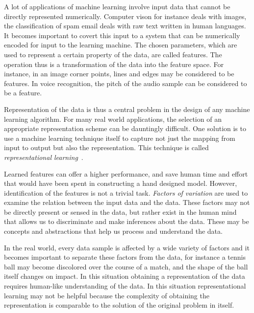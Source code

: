 A lot of applications of machine learning involve input data that cannot be directly represented numerically. Computer vison for instance deals with images, the classification of spam email deals with raw text written in human languages. It becomes important to covert this input to a system that can be numerically encoded for input to the learning machine. The chosen parameters, which are used to represent a certain property of the data, are called features. The operation thus is a transformation of the data into the feature space. For instance, in an image corner points, lines and edges may be considered to be features. In voice recognition, the pitch of the audio sample can be considered to be a feature.

Representation of the data is thus a central problem in the design of any machine learning algorithm. For many real world applications, the selection of an appropriate representation scheme can be dauntingly difficult. One solution is to use a machine learning technique itself to capture not just the mapping from input to output but also the representation. This technique is called \emph{representational learning}~\cite{bengio2013representation}.

Learned features can offer a higher performance, and save human time and effort that would have been spent in constructing a hand designed model. However, identification of the features is not a trivial task.
\emph{Factors of variation} are used to examine the relation between the input data and the data. These factors may not be directly present or sensed in the data, but rather exist in the human mind that allows us to discriminate and make inferences about the data. These may be concepts and abstractions that help us process and understand the data. 


In the real world, every data sample is affected by a wide variety of factors and it becomes important to separate these factors from the data, for instance a tennis ball may become discolored over the course of a match, and the shape of the ball itself changes on impact. In this situation obtaining a representation of the data requires human-like understanding of the data. In this situation representational learning may not be helpful because the complexity of obtaining the representation is comparable to the solution of the original problem in itself.

